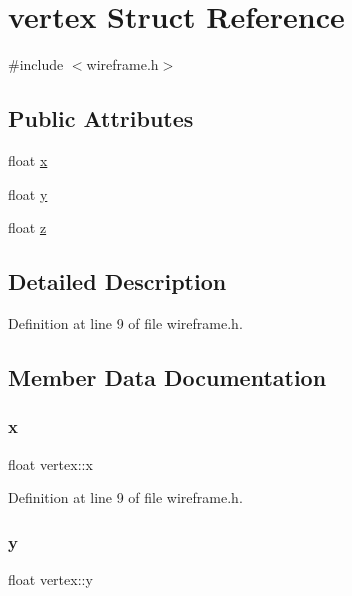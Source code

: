 \hypertarget{structvertex}{}\section{vertex Struct Reference}
\label{structvertex}


{\ttfamily \#include $<$wireframe.\+h$>$}

\subsection*{Public Attributes}
\begin{DoxyCompactItemize}
\item 
float \mbox{\hyperlink{structvertex_a664a5bbbbca4e1a99d85a163f6a08405}{x}}
\item 
float \mbox{\hyperlink{structvertex_aea3246afd0395032be285a49bcd4b146}{y}}
\item 
float \mbox{\hyperlink{structvertex_afe9862f7d3456ee2d352d94cbe5a84da}{z}}
\end{DoxyCompactItemize}


\subsection{Detailed Description}


Definition at line 9 of file wireframe.\+h.



\subsection{Member Data Documentation}
\mbox{\label{structvertex_a664a5bbbbca4e1a99d85a163f6a08405}} 
\subsubsection{\texorpdfstring{x}{x}}
{\footnotesize\ttfamily float vertex\+::x}



Definition at line 9 of file wireframe.\+h.

\mbox{\label{structvertex_aea3246afd0395032be285a49bcd4b146}} 
\subsubsection{\texorpdfstring{y}{y}}
{\footnotesize\ttfamily float vertex\+::y}



